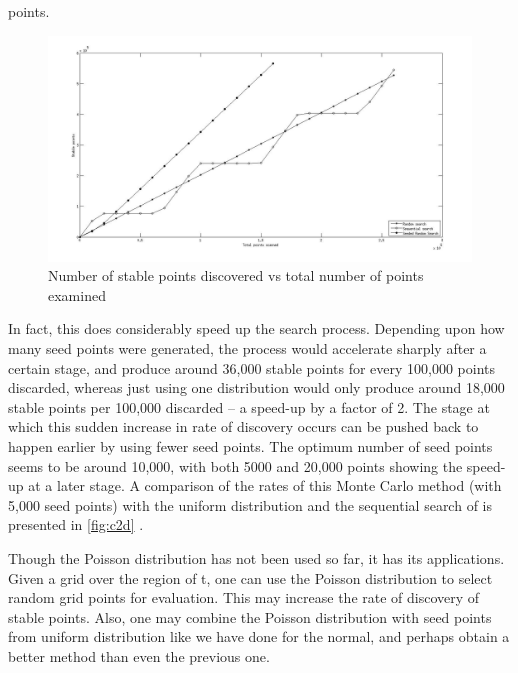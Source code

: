 points.
\begin{figure}
\centering
\includegraphics[width=\textwidth]{seed.jpg}
\caption{Number of stable points discovered vs total number of points examined}
\label{fig:c2d}
\end{figure}

In fact, this does considerably speed up the search process. Depending 
upon how many seed points were generated, the process would accelerate 
sharply after a certain stage, and produce around 36,000 stable points for 
every 100,000 points discarded, whereas just using one distribution would 
only produce around 18,000 stable points per 100,000 discarded -- a speed-up
by a factor of 2. The stage at which this sudden increase in rate of 
discovery occurs can be pushed back to happen earlier by using fewer seed 
points. The optimum number of seed points seems to be around 10,000, with 
both 5000 and 20,000 points showing the speed-up at a later stage. A 
comparison of the rates of this Monte Carlo method (with 5,000 
seed points) with the uniform distribution and the sequential search of 
is presented in \autoref{fig:c2d} .

Though the Poisson distribution has not been used so far, it has its 
applications. Given a grid over the region of \gls{t}, one can use the 
Poisson distribution to select random grid points for evaluation. This may 
increase the rate of discovery of stable points. Also, one may combine the 
Poisson distribution with seed points from uniform distribution like we 
have done for the normal, and perhaps obtain a better method than even the 
previous one.